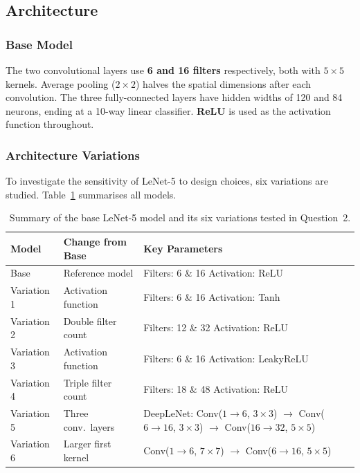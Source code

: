 \documentclass[12pt, a4paper]{article}
\renewcommand{\arraystretch}{1.12}
\begin{document}
\subsection{Architecture}

\subsubsection{Base Model}
 The
two convolutional layers use \textbf{6 and 16 filters} respectively, both with
$5\times5$ kernels. Average pooling ($2\times2$) halves the spatial dimensions after
each convolution. The three fully-connected layers have hidden widths of 120 and 84
neurons, ending at a 10-way linear classifier. \textbf{ReLU} is used as the activation
function throughout.

\subsubsection{Architecture Variations}

To investigate the sensitivity of LeNet-5 to design choices, six variations are studied.
Table~\ref{tab:q2_variants} summarises all models.

\begin{table}[H]
\centering
\renewcommand{\arraystretch}{1.3}
\begin{tabular}{l p{3.0cm} p{7.8cm}}
\toprule
\textbf{Model} & \textbf{Change from Base} & \textbf{Key Parameters} \\
\midrule
Base        & Reference model       & Filters: 6 \& 16 \quad Activation: ReLU \\
Variation 1 & Activation function   & Filters: 6 \& 16 \quad Activation: Tanh \\
Variation 2 & Double filter count   & Filters: 12 \& 32 \quad Activation: ReLU \\
Variation 3 & Activation function   & Filters: 6 \& 16 \quad Activation: LeakyReLU \\
Variation 4 & Triple filter count   & Filters: 18 \& 48 \quad Activation: ReLU \\
Variation 5 & Three conv.\ layers   &
  DeepLeNet: Conv($1\!\to\!6$, $3{\times}3$)
  $\to$ Conv($6\!\to\!16$, $3{\times}3$)
  $\to$ Conv($16\!\to\!32$, $5{\times}5$) \\
Variation 6 & Larger first kernel   &
  Conv($1\!\to\!6$, $7{\times}7$) $\to$ Conv($6\!\to\!16$, $5{\times}5$) \\
\bottomrule
\end{tabular}
\caption{Summary of the base LeNet-5 model and its six variations tested in Question~2.}
\label{tab:q2_variants}
\end{table}
\end{document}
